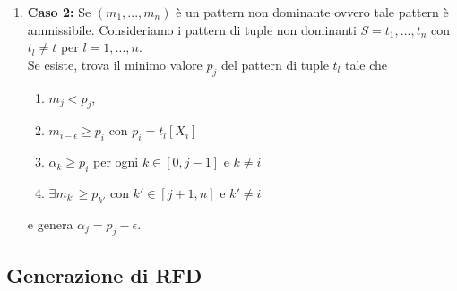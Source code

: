 \begin{itemize}
\begin{enumerate}
				\item  \textbf{Caso 2:} Se $(m_{1},...,m_{n})$ è un pattern non dominante ovvero tale pattern è ammissibile.
				Consideriamo i pattern di tuple non dominanti $S=t_{1},...,t_{n}$ con $t_{l}\neq t$ per $l=1,...,n$.\\
				Se esiste, trova il minimo valore $p_{j}$ del pattern di tuple $t_{l}$ tale che
				\begin{enumerate}
					\item  $m_{j}<p_{j}$, 
					\item $m_{i-\epsilon} \geq p_{i}$ con $p_{i}=t_{l}[X_{i}]$
					\item $\alpha_{k} \geq p_{i}$ per ogni $k \in [0,j-1]$ e $k \neq i$
					\item $\exists m_{k'} \geq p_{k'}$ con $k' \in [j+1,n]$ e $k' \neq i$
				\end{enumerate}  
				e genera $\alpha_{j}= p_{j} -\epsilon$.\\ 
			\end{enumerate}  
			
			
\end{itemize}

\subsection{Generazione di RFD}